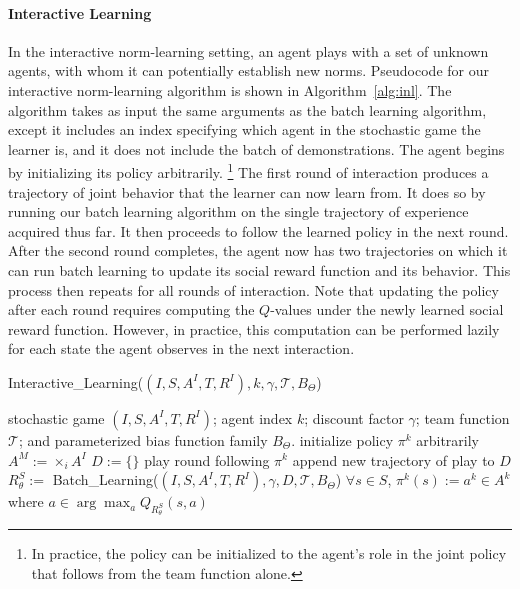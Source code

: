 
\paragraph{Interactive Learning}
\label{sec:interactive}

In the interactive norm-learning setting, an agent plays with a set of
unknown agents, with whom it can potentially establish new
norms. Pseudocode for our interactive norm-learning algorithm is shown
in Algorithm~\ref{alg:inl}. The algorithm takes as input the same
arguments as the batch learning algorithm, except it includes an index
specifying which agent in the stochastic game the learner is, and it
does not include the batch of demonstrations. The agent begins by
initializing its policy arbitrarily.%
\footnote{In practice, the policy can be initialized to the agent's role
in the joint policy that follows from the team function alone.}
%
The first round of interaction produces a trajectory of joint behavior
that the learner can now learn from.  It does so by running our batch
learning algorithm on the single trajectory of experience acquired
thus far.  It then proceeds to follow the learned policy in the next
round.  After the second round completes, the agent now has two
trajectories on which it can run batch learning to update its social
reward function and its behavior.  This process then repeats for all
rounds of interaction.  
%
Note that updating the policy after each round requires computing the
$Q$-values under the newly learned social reward function.  However,
in practice, this computation can be performed lazily for each state
the agent observes in the next interaction.

\begin{algorithm}[t]
\caption{Interactive\_Learning($(I,S,A^I,T,R^I), k, \gamma, {\mathcal T}, B_\Theta$)}
\label{alg:inl}
\begin{algorithmic}
\Require stochastic game $(I,S,A^I,T,R^I)$; agent index $k$; discount factor $\gamma$; team function ${\mathcal T}$; and parameterized bias function family $B_\Theta$.
\State initialize policy $\pi^k$ arbitrarily
\State $A^M := \times_i A^I$ 
\State $D := \{\}$
\State play round following $\pi^k$ %
\State append new trajectory of play to $D$
\State $R^S_\theta :=$ Batch\_Learning($(I,S,A^I,T,R^I), \gamma, D, {\mathcal T}, B_\Theta$)
\State $\forall s \in S$, $\pi^k(s) := a^k \in A^k$ where $a \in \arg \max_a Q_{R^S_\theta}(s, a)$
\EndFor 
\end{algorithmic}
\end{algorithm}
